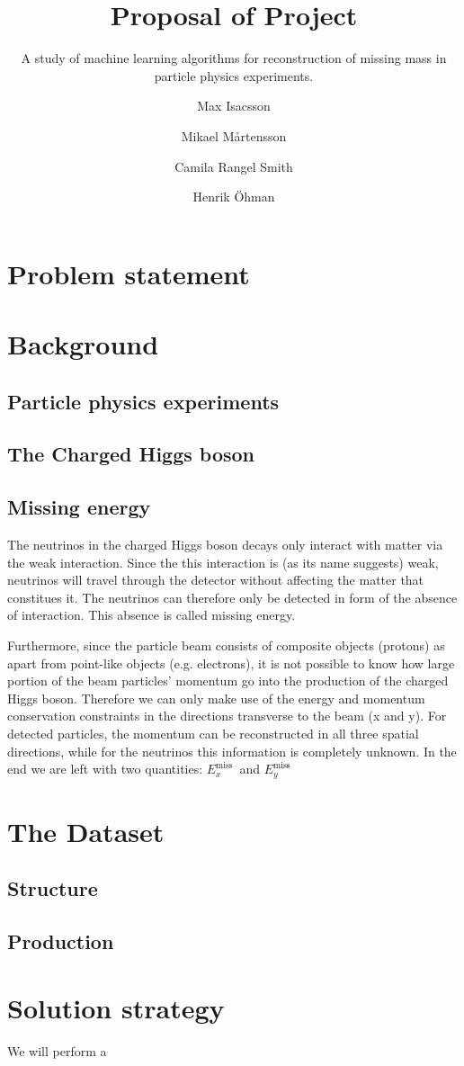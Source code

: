 \documentclass{scrartcl}
\title{Proposal of Project}
\subtitle{A study of machine learning algorithms for reconstruction of missing mass in particle physics experiments.}
\author[1]{Max Isacsson}
\author[2]{Mikael M\aa rtensson}
\author[3]{Camila Rangel Smith}
\author[4]{Henrik \"{O}hman}
\affil[1]{\small\url{max.isacsson@physics.uu.se}}
\affil[2]{\url{mikael.martensson@physics.uu.se}}
\affil[3]{\url{camila.rangel@physics.uu.se}}
\affil[4]{\url{ohman@cern.ch}}
\newcommand{\exmiss}{$E_x^\text{miss}$}
\newcommand{\eymiss}{$E_y^\text{miss}$}
\begin{document}
\maketitle

\section{Problem statement}


\section{Background}
\subsection{Particle physics experiments}

\subsection{The Charged Higgs boson}
\subsection{Missing energy}
The neutrinos in the charged Higgs boson decays only interact with matter via the weak interaction. Since the this interaction is (as its name suggests) weak, neutrinos will travel through the detector without affecting the matter that constitues it. The neutrinos can therefore only be detected in form of the absence of interaction. This absence is called missing energy.

Furthermore, since the particle beam consists of composite objects (protons) as apart from point-like objects (e.g. electrons), it is not possible to know how large portion of the beam particles' momentum go into the production of the charged Higgs boson. Therefore we can only make use of the energy and momentum conservation constraints in the directions transverse to the beam (x and y). For detected particles, the momentum can be reconstructed in all three spatial directions, while for the neutrinos this information is completely unknown. In the end we are left with two quantities: \exmiss\ and \eymiss\.

\section{The Dataset}
\subsection{Structure}

\subsection{Production}


\section{Solution strategy}
We will perform a 


% 
\end{document}
